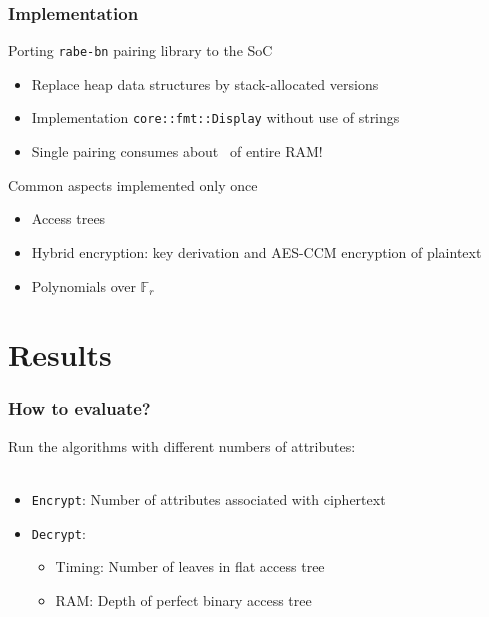 \begin{frame}[c, fragile]
    \frametitle{Implementation}
    \begin{block}{Porting \texttt{rabe-bn} pairing library to the SoC}
        \begin{itemize}
            \item Replace heap data structures by stack-allocated versions
            \item Implementation \verb+core::fmt::Display+ without use of strings
            \item Single pairing consumes about \textonequarter ~of entire RAM!
        \end{itemize} 
    \end{block}
    \pause
    \begin{block}{Common aspects implemented only once}
        \begin{itemize}
            \item Access trees
            \item Hybrid encryption: key derivation and AES-CCM encryption of plaintext
            \item Polynomials over $\mathbb{F}_r$
        \end{itemize}
    \end{block}

\end{frame}

\section{Results}
\begin{frame}[c]
    \frametitle{How to evaluate?}
    \begin{minipage}{.59\textwidth}
        Run the algorithms with different numbers of attributes:\\
        ~
        \begin{itemize} 
            \setlength\itemsep{.75em}
            \item \texttt{Encrypt}: Number of attributes associated with ciphertext
            \item \texttt{Decrypt}: \begin{itemize}
                \item Timing: Number of leaves in flat access tree
                \item RAM: Depth of perfect binary access tree
            \end{itemize}
        \end{itemize}
    \end{minipage}
    \begin{minipage}{.4\textwidth}
        
    \end{minipage}
\end{frame}

